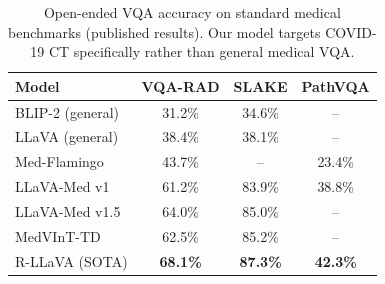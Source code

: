 
\begin{table}[t]
\centering
\caption{Open-ended VQA accuracy on standard medical benchmarks (published results). 
Our model targets COVID-19 CT specifically rather than general medical VQA.}
\label{tab:vqa_accuracy}
\begin{tabular}{lccc}
\toprule
\textbf{Model} & \textbf{VQA-RAD} & \textbf{SLAKE} & \textbf{PathVQA} \\
\midrule
BLIP-2 (general) & 31.2\% & 34.6\% & -- \\
LLaVA (general) & 38.4\% & 38.1\% & -- \\
Med-Flamingo & 43.7\% & -- & 23.4\% \\
LLaVA-Med v1 & 61.2\% & 83.9\% & 38.8\% \\
LLaVA-Med v1.5 & 64.0\% & 85.0\% & -- \\
MedVInT-TD & 62.5\% & 85.2\% & -- \\
R-LLaVA (SOTA) & \textbf{68.1\%} & \textbf{87.3\%} & \textbf{42.3\%} \\
\bottomrule
\end{tabular}
\end{table}
